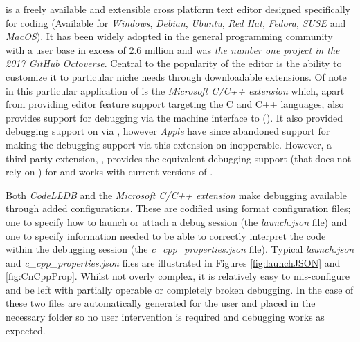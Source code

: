  is a freely available and extensible cross platform text editor designed specifically for coding 
(Available for \emph{Windows}, \emph{Debian}, \emph{Ubuntu}, \emph{Red Hat}, \emph{Fedora}, \emph{SUSE} and \emph{MacOS}). It has been widely adopted in the general programming
community with a user base in excess of 2.6 million\citep{VCusers} and was \emph{the number one project in the 2017 GitHub Octoverse}. Central to the 
popularity of the editor is the ability to customize it to particular niche needs through downloadable extensions. Of note in this particular application of  
is the \emph{Microsoft C/C++ extension} \citep{VSCodeCCppExt} which, apart from providing editor feature support targeting the C and C++ languages, also provides support for 
debugging via the machine interface to  (). It also provided debugging support on  via , however \emph{Apple} have since abandoned support for  making 
the debugging support via this extension on  inopperable. However, a third party extension, \citep{CodeLLDB}, provides the equivalent debugging support (that does not rely on
) for  and works with current versions of . 

Both \emph{CodeLLDB} and the \emph{Microsoft C/C++ extension} make debugging available through added configurations. These are codified using \citep{JSON} format configuration files;
one to specify how to launch or attach a debug session (the \emph{launch.json} file) and one to specify information needed to be able to correctly interpret the code within the debugging 
session (the \emph{c\_cpp\_properties.json} file). Typical \emph{launch.json} and \emph{c\_cpp\_properties.json} files are illustrated in Figures \ref{fig:launchJSON} and \ref{fig:CnCppProp}.
Whilst not overly complex, it is relatively easy to mis-configure and be left with partially operable or completely broken debugging. In the case of  these two files are 
automatically generated for the user and placed in the necessary folder so no user intervention is required and debugging works as expected.

